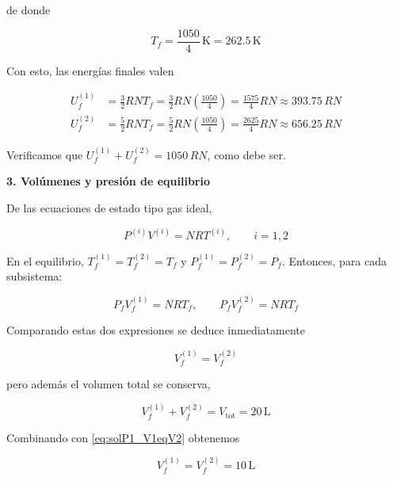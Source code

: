 \documentclass{article}
\begin{document}
de donde

\begin{equation}
\boxed{
T_{f} = \frac{1050}{4}\,\mathrm{K} = 262.5\,\mathrm{K}
}
\label{eq:solP1_Tf}
\end{equation}

Con esto, las energías finales valen

\begin{equation}
\begin{split}
U^{(1)}_{f}
&= \frac{3}{2}R N T_{f}
 = \frac{3}{2}R N \left(\frac{1050}{4}\right)
 = \frac{1575}{4} R N
 \approx 393.75\,R N
\\[4pt]
U^{(2)}_{f}
&= \frac{5}{2}R N T_{f}
 = \frac{5}{2}R N \left(\frac{1050}{4}\right)
 = \frac{2625}{4} R N
 \approx 656.25\,R N
\end{split}
\label{eq:solP1_Uf_num}
\end{equation}

Verificamos que \(U^{(1)}_{f}+U^{(2)}_{f} = 1050\,R N\), como debe ser.

\vspace{0.4cm}
\noindent
\textcolor{Apple Green}{\textbf{3. Volúmenes y presión de equilibrio}}

De las ecuaciones de estado tipo gas ideal,

\begin{equation}
P^{(i)} V^{(i)} = N R T^{(i)},
\qquad i=1,2
\label{eq:solP1_ideal}
\end{equation}

En el equilibrio, \(T^{(1)}_{f} = T^{(2)}_{f} = T_{f}\) y
\(P^{(1)}_{f} = P^{(2)}_{f} = P_{f}\).  
Entonces, para cada subsistema:

\begin{equation}
P_{f} V^{(1)}_{f} = N R T_{f},
\qquad
P_{f} V^{(2)}_{f} = N R T_{f}
\label{eq:solP1_PfVf}
\end{equation}

Comparando estas dos expresiones se deduce inmediatamente

\begin{equation}
V^{(1)}_{f} = V^{(2)}_{f}
\label{eq:solP1_V1eqV2}
\end{equation}

pero además el volumen total se conserva,

\[
V^{(1)}_{f} + V^{(2)}_{f} = V_{\text{tot}} = 20\,\mathrm{L}
\]

Combinando con \eqref{eq:solP1_V1eqV2} obtenemos

\begin{equation}
\boxed{
V^{(1)}_{f} = V^{(2)}_{f} = 10\,\mathrm{L}
}
\label{eq:solP1_Vf}
\end{equation}
\end{document}
